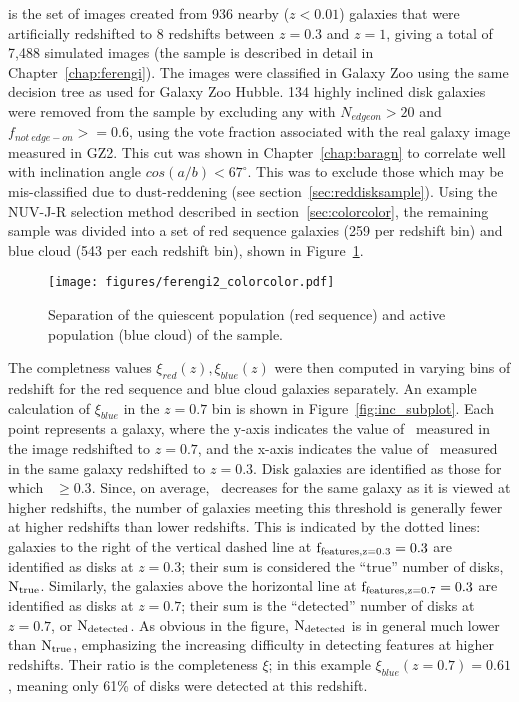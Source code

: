  is the set of images created from 936 nearby ($z<0.01$) galaxies that were artificially redshifted to 8 redshifts between $z=0.3$ and $z=1$, giving a total of 7,488 simulated images (the sample is described in detail in Chapter~\ref{chap:ferengi}). The images were classified in Galaxy Zoo using the same decision tree as used for Galaxy Zoo Hubble. 134 highly inclined disk galaxies were removed from the sample by excluding any with $N_{edgeon}>20$ and $f_{not~edge-on}>=0.6$, using the vote fraction associated with the real galaxy image measured in GZ2. This cut was shown in Chapter~\ref{chap:baragn} to correlate well with inclination angle $cos(a/b)<67^\circ$. This was to exclude those which may be mis-classified due to dust-reddening (see section~\ref{sec:reddisksample}).  Using the NUV-J-R selection method described in section~\ref{sec:colorcolor}, the remaining sample was divided into a set of red sequence galaxies (259 per redshift bin) and blue cloud (543 per each redshift bin), shown in Figure~\ref{fig:ferengi2colorcolor}.
 

\begin{figure}
\centering
\texttt{[image: figures/ferengi2\_colorcolor.pdf]}
\caption{Separation of the quiescent population (red sequence) and active population (blue cloud) of the  sample.}
\label{fig:ferengi2colorcolor}
\end{figure}


The completness values $\xi_{red}(z),\xi_{blue}(z)$ were then computed in varying bins of redshift for the red sequence and blue cloud galaxies separately. An example calculation of $\xi_{blue}$ in the $z=0.7$ bin is shown in Figure~\ref{fig:inc_subplot}. Each point represents a  galaxy, where the y-axis indicates the value of \ffeatures~measured in the image redshifted to $z=0.7$, and the x-axis indicates the value of \ffeatures~measured in the same galaxy redshifted to $z=0.3$. Disk galaxies are identified as those for which \ffeatures~$\ge0.3$. Since, on average, \ffeatures~decreases for the same galaxy as it is viewed at higher redshifts, the number of galaxies meeting this threshold is generally fewer at higher redshifts than lower redshifts. This is indicated by the dotted lines: galaxies to the right of the vertical dashed line at $\rm f_{features,z=0.3}=0.3$ are identified as disks at $z=0.3$; their sum is considered the ``true'' number of disks, $\rm N_{true}$. Similarly, the galaxies above the horizontal line at $\rm f_{features,z=0.7}=0.3$ are identified as disks at $z=0.7$; their sum is the ``detected'' number of disks at $z=0.7$, or $\rm N_{detected}$. As obvious in the figure, $\rm N_{detected}$ is in general much lower than $\rm N_{true}$, emphasizing the increasing difficulty in detecting features at higher redshifts. Their ratio is the completeness $\xi$; in this example $\xi_{blue}(z=0.7)=0.61$, meaning only 61\% of disks were detected at this redshift. 

